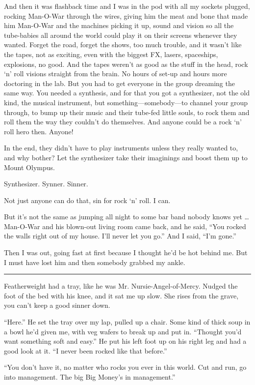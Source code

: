 And then it was flashback time and I was in the pod with all my sockets plugged, rocking Man-O-War through the wires, giving him the meat and bone that made him Man-O-War and the machines picking it up, sound and vision so all the tube-babies all around the world could play it on their screens whenever they wanted. Forget the road, forget the shows, too much trouble, and it wasn't like the tapes, not as exciting, even with the biggest FX, lasers, spaceships, explosions, no good. And the tapes weren't as good as the stuff in the head, rock ‘n' roll visions straight from the brain. No hours of set-up and hours more doctoring in the lab. But you had to get everyone in the group dreaming the same way. You needed a synthesis, and for that you got a synthesizer, not the old kind, the musical instrument, but something—somebody—to channel your group through, to bump up their music and their tube-fed little souls, to rock them and roll them the way they couldn't do themselves. And anyone could be a rock ‘n' roll hero then. Anyone!

In the end, they didn't have to play instruments unless they really wanted to, and why bother? Let the synthesizer take their imaginings and boost them up to Mount Olympus.

Synthesizer. Synner. Sinner.

Not just anyone can do that, sin for rock ‘n' roll. I can.

But it's not the same as jumping all night to some bar band nobody knows yet … Man-O-War and his blown-out living room came back, and he said, “You rocked the walls right out of my house. I'll never let you go.”
And I said, “I'm gone.”

Then I was out, going fast at first because I thought he'd be hot behind me. But I must have lost him and then somebody grabbed my ankle.

\fancybreak{* * *}

Featherweight had a tray, like he was Mr. Nursie-Angel-of-Mercy. Nudged the foot of the bed with his knee, and it sat me up slow. She rises from the grave, you can't keep a good sinner down.

“Here.” He set the tray over my lap, pulled up a chair. Some kind of thick soup in a bowl he'd given me, with veg wafers to break up and put in. “Thought you'd want something soft and easy.” He put his left foot up on his right leg and had a good look at it. “I never been rocked like that before.”

“You don't have it, no matter who rocks you ever in this world. Cut and run, go into management. The big Big Money's in management.”

